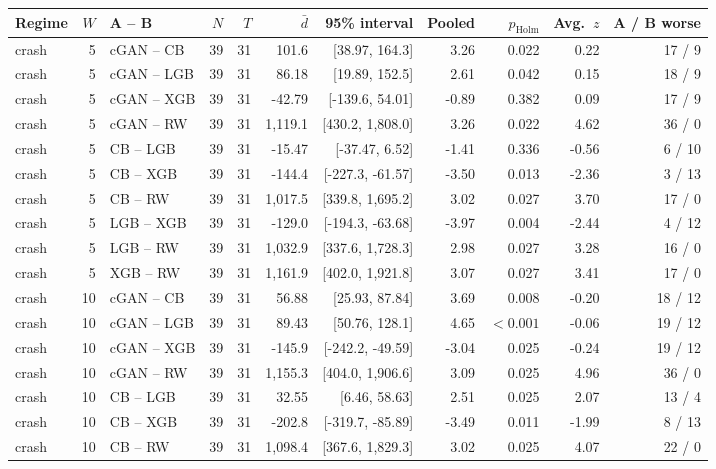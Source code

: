 \documentclass[11pt,a4paper]{article}
\begin{document}
{\footnotesize\setlength{\tabcolsep}{4pt}
\begin{longtable}{lrlrrrrrrrr}
\toprule
Regime & $W$ & A -- B & $N$ & $T$ & $\bar d$ & 95\% interval & Pooled & $p_{\mathrm{Holm}}$ & Avg.\ $z$ & A / B worse \\
\midrule
\endhead
\bottomrule
\endfoot
crash & 5 & cGAN -- CB & 39 & 31 & 101.6 & [38.97, 164.3] & 3.26 & 0.022 & 0.22 & 17 / 9 \\
crash & 5 & cGAN -- LGB & 39 & 31 & 86.18 & [19.89, 152.5] & 2.61 & 0.042 & 0.15 & 18 / 9 \\
crash & 5 & cGAN -- XGB & 39 & 31 & -42.79 & [-139.6, 54.01] & -0.89 & 0.382 & 0.09 & 17 / 9 \\
crash & 5 & cGAN -- RW & 39 & 31 & 1,119.1 & [430.2, 1,808.0] & 3.26 & 0.022 & 4.62 & 36 / 0 \\
crash & 5 & CB -- LGB & 39 & 31 & -15.47 & [-37.47, 6.52] & -1.41 & 0.336 & -0.56 & 6 / 10 \\
crash & 5 & CB -- XGB & 39 & 31 & -144.4 & [-227.3, -61.57] & -3.50 & 0.013 & -2.36 & 3 / 13 \\
crash & 5 & CB -- RW & 39 & 31 & 1,017.5 & [339.8, 1,695.2] & 3.02 & 0.027 & 3.70 & 17 / 0 \\
crash & 5 & LGB -- XGB & 39 & 31 & -129.0 & [-194.3, -63.68] & -3.97 & 0.004 & -2.44 & 4 / 12 \\
crash & 5 & LGB -- RW & 39 & 31 & 1,032.9 & [337.6, 1,728.3] & 2.98 & 0.027 & 3.28 & 16 / 0 \\
crash & 5 & XGB -- RW & 39 & 31 & 1,161.9 & [402.0, 1,921.8] & 3.07 & 0.027 & 3.41 & 17 / 0 \\
\addlinespace
crash & 10 & cGAN -- CB & 39 & 31 & 56.88 & [25.93, 87.84] & 3.69 & 0.008 & -0.20 & 18 / 12 \\
crash & 10 & cGAN -- LGB & 39 & 31 & 89.43 & [50.76, 128.1] & 4.65 & $<0.001$ & -0.06 & 19 / 12 \\
crash & 10 & cGAN -- XGB & 39 & 31 & -145.9 & [-242.2, -49.59] & -3.04 & 0.025 & -0.24 & 19 / 12 \\
crash & 10 & cGAN -- RW & 39 & 31 & 1,155.3 & [404.0, 1,906.6] & 3.09 & 0.025 & 4.96 & 36 / 0 \\
crash & 10 & CB -- LGB & 39 & 31 & 32.55 & [6.46, 58.63] & 2.51 & 0.025 & 2.07 & 13 / 4 \\
crash & 10 & CB -- XGB & 39 & 31 & -202.8 & [-319.7, -85.89] & -3.49 & 0.011 & -1.99 & 8 / 13 \\
crash & 10 & CB -- RW & 39 & 31 & 1,098.4 & [367.6, 1,829.3] & 3.02 & 0.025 & 4.07 & 22 / 0 \\

\end{longtable}}
\end{document}

